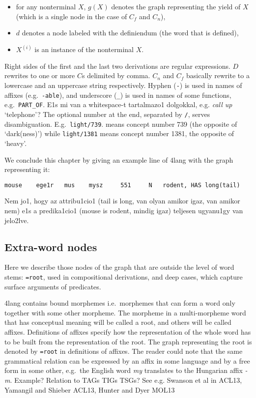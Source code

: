 \documentclass[a4paper,10pt]{article}
\begin{document}
\begin{itemize}
 \item for any nonterminal $X$, $g(X)$ denotes the graph representing the yield of $X$ (which is a single node in the case of $C_f$ and $C_n$),
 \item $d$ denotes a node labeled with the definiendum (the word that is defined),
 \item $X^{(i)}$ is an instance of the nonterminal $X$.
\end{itemize}
Right sides of the first and the last two derivations are regular
expressions. $D$ rewrites to one or more $C$s delimited by comma. $C_n$ and
$C_f$ basically rewrite to a lowercase and an uppercase string
respectively. Hyphen (\texttt{-}) is used in names of affixes
(e.g.\ \texttt{-able}), and underscore (\texttt{\_}) is used in names of some
functions, e.g.\ \texttt{PART\_OF}.{\color{red} E1s mi van a whitespace-t 
tartalmazo1 dolgokkal, e.g. {\it call up} `telephone'?}
 The optional number at the end, separated
by \texttt{/}, serves disambiguation. E.g.\ \texttt{light/739}.  means concept
number 739 (the opposite of `dark(ness)') while \texttt{light/1381} means
concept number 1381, the opposite of `heavy'.

We conclude this chapter by giving an example line of 4lang with the graph representing it:

\begin{verbatim}
mouse	 ege1r	 mus	mysz	 551	 N	 rodent, HAS long(tail)
\end{verbatim}

{\color{red}Nem jo1, hogy az attribu1cio1 (tail is long, van olyan amikor
  igaz, van amikor nem) e1s a predika1cio1 (mouse is rodent, mindig igaz) 
teljesen ugyanu1gy van jelo2lve.}

\subsection{Extra-word nodes}\label{sec_extraword}
Here we describe those nodes of the graph that are outside the level of word
stems: \texttt{=root}, used in compositional derivations, and deep cases,
which capture surface arguments of predicates.

4lang contains bound morphemes i.e.\ morphemes that can form a word only
together with some other morpheme. The morpheme in a multi-morpheme word that
has conceptual meaning will be called a root, and others will be called
affixes. Definitions of affixes specify how the representation of the whole
word has to be built from the representation of the root. The graph
representing the root is denoted by \texttt{=root} in definitions of
affixes. The reader could note that the same grammatical relation can be
expressed by an affix in some language and by a free form in some other,
e.g.\ the English word \emph{my} translates to the Hungarian affix
\emph{-m}. {\color{red} Example? Relation to TAGs TIGs TSGs? See e.g. Swanson
  et al in ACL13, Yamangil and Shieber ACL13, Hunter and Dyer MOL13}
\end{document}
